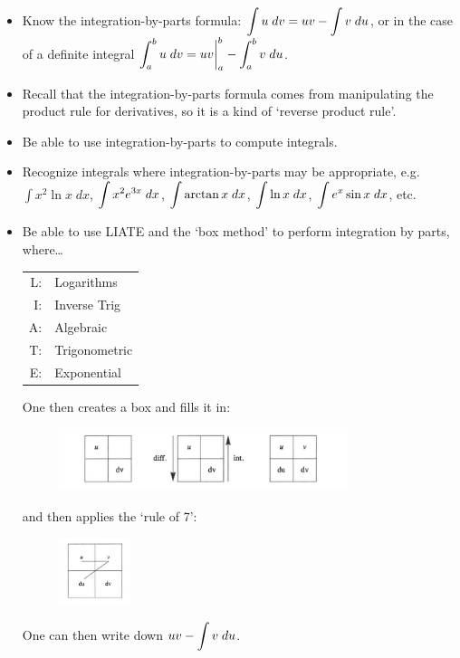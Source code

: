 \documentclass[11pt,letterpaper]{article}
\begin{document}
\begin{itemize}
\item Know the integration-by-parts formula: $\displaystyle\int u \;dv= uv - \int v \;du$, or in the case of a definite integral $\displaystyle\int_a^b u \;dv= uv \bigg|_a^b - \int_a^b v \;du$.

\item Recall that the integration-by-parts formula comes from manipulating the product rule for derivatives, so it is a kind of `reverse product rule'.

\item Be able to use integration-by-parts to compute integrals. 

\item Recognize integrals where integration-by-parts may be appropriate, e.g. $\int x^2 \ln x \;dx$, $\displaystyle\int x^2 e^{3x} \;dx$, $\displaystyle\int \arctan x \;dx$, $\displaystyle\int \ln x \;dx$, $\displaystyle\int e^x \sin x \;dx$, etc. 

\item Be able to use LIATE and the `box method' to perform integration by parts, where\dots
	\begin{table}[H]
	\centering
	\begin{tabular}{rl}
	L: & Logarithms \\
	I: & Inverse Trig \\
	A: & Algebraic \\
	T: & Trigonometric \\
	E: & Exponential
	\end{tabular}
	\end{table}
One then creates a box and fills it in:
	\begin{figure}[H]
	\centering
	\includegraphics[width=0.80\textwidth]{images/box.png}
	\end{figure}
and then applies the `rule of 7':
	\begin{figure}[H]
	\centering
	\includegraphics[width=0.20\textwidth]{images/7.png}
	\end{figure}
One can then write down $\displaystyle uv - \int v \;du$. 


\end{itemize}
\end{document}
